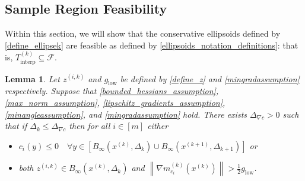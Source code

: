 \documentclass{article}
\newtheorem{lemma}[theorem]{Lemma}
\theoremstyle{case}
\numberwithin{theorem}{subsection}
\newcommand{\dk}{\Delta_k}
\newcommand{\dkpo}{\Delta_{k+1}}
\newcommand{\feasible}{{\mathcal F}}
\newcommand{\gmcik}{{\nabla m_{c_i}^{(k)}\left(\xk\right)}}
\newcommand{\mingraddelta}{{\Delta_{\nabla c}}}
\newcommand{\mingrad}{{ g_{\textrm{low}} }}
\newcommand{\sampletrk}{{T_{\text{interp}}^{(k)}}}
\newcommand{\tr}{{ B_{\infty}\left(\xk, \dk\right) }}
\newcommand{\trkpo}{{ B_{\infty}\left(\xkpo, \dkpo\right) }}
\newcommand{\xkpo}{{{x}^{(k+1)}}}
\newcommand{\xk}{x^{(k)}}
\newcommand{\zik}{{z^{(i, k)}}}
\newcommand{\fik}{{C^{(i, k)}}}
\begin{document}
\subsection{Sample Region Feasibility}
\label{ellipsoid_is_feasible_section}

Within this section, we will show that the conservative ellipsoids defined by \cref{define_ellipsek} are feasible as defined by \cref{ellipsoids_notation_definitions}:
that is, $\sampletrk \subseteq \feasible$.

\begin{lemma}
\label{only_small_z_matters}
Let $\zik$ and $\mingrad$ be defined by \cref{define_z} and \cref{mingradassumption} respectively.
Suppose that 
\cref{bounded_hessians_assumption},
\cref{max_norm_assumption},
\cref{lipschitz_gradients_assumption},
\cref{minangleassumption},
and \cref{mingradassumption} hold.
There exists $\mingraddelta > 0$ such that if $\dk \le \mingraddelta$ then for all $i \in [m]$ either
\begin{itemize}
\item $c_i(y) \le 0 \quad \forall y \in \left[\tr \cup \trkpo\right]$ or
\item both $\zik \in \tr$ and $\left\|\gmcik\right\| > \frac 1 2 \mingrad$.
\end{itemize}
\end{lemma}
\end{document}
